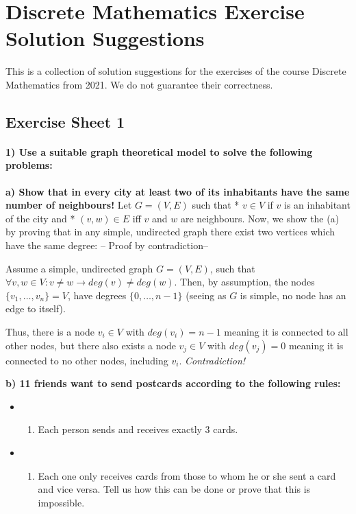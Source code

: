 \documentclass[
]{article}
\author{}
\date{}
\providecommand{\tightlist}{%
  \setlength{\itemsep}{0pt}\setlength{\parskip}{0pt}}
\begin{document}
\hypertarget{discrete-mathematics-exercise-solution-suggestions}{%
\section{Discrete Mathematics Exercise Solution
Suggestions}\label{discrete-mathematics-exercise-solution-suggestions}}

This is a collection of solution suggestions for the exercises of the
course Discrete Mathematics from 2021. We do not guarantee their
correctness.

\hypertarget{exercise-sheet-1}{%
\subsection{Exercise Sheet 1}\label{exercise-sheet-1}}

\hypertarget{use-a-suitable-graph-theoretical-model-to-solve-the-following-problems}{%
\paragraph{1) Use a suitable graph theoretical model to solve the
following
problems:}\label{use-a-suitable-graph-theoretical-model-to-solve-the-following-problems}}

\textbf{a) Show that in every city at least two of its inhabitants have
the same number of neighbours!} Let \(G = (V,E)\) such that *
\(v \in V\) if \(v\) is an inhabitant of the city and * \((v,w) \in E\)
iff \(v\) and \(w\) are neighbours. Now, we show the (a) by proving that
in any simple, undirected graph there exist two vertices which have the
same degree: -- Proof by contradiction--

Assume a simple, undirected graph \(G = (V,E)\), such that
\(\forall v,w \in V: v \neq w \rightarrow deg(v) \neq deg(w)\). Then, by
assumption, the nodes \(\{v_1,\dots , v_n\} = V\), have degrees
\(\{0, \dots, n-1\}\) (seeing as \(G\) is simple, no node has an edge to
itself).

Thus, there is a node \(v_i \in V\) with \(deg(v_i) = n-1\) meaning it
is connected to all other nodes, but there also exists a node
\(v_j \in V\) with \(deg(v_j) = 0\) meaning it is connected to no other
nodes, including \(v_i\). \emph{Contradiction!}

\textbf{b) 11 friends want to send postcards according to the following
rules:}

\begin{itemize}
\item
  \begin{enumerate}
  \def\labelenumi{(\roman{enumi})}
  \tightlist
  \item
    Each person sends and receives exactly 3 cards.
  \end{enumerate}
\item
  \begin{enumerate}
  \def\labelenumi{(\roman{enumi})}
  \setcounter{enumi}{1}
  \tightlist
  \item
    Each one only receives cards from those to whom he or she sent a
    card and vice versa. Tell us how this can be done or prove that this
    is impossible.
  \end{enumerate}
\end{itemize}
\end{document}
